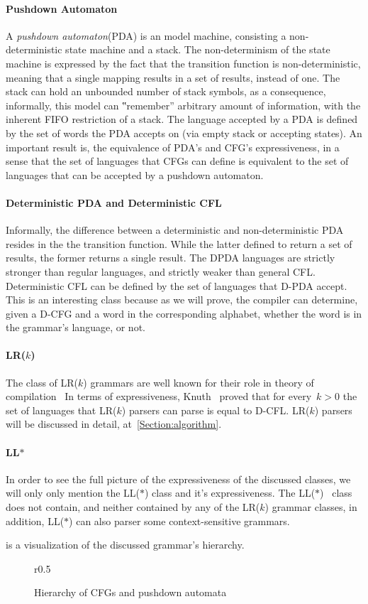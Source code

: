 \paragraph{Pushdown Automaton}
A \emph{pushdown automaton}(PDA) is an model machine, consisting a non-deterministic state machine
  and a stack.
The non-determinism of the state machine is expressed by the fact that the transition function
  is non-deterministic, meaning that a single mapping results in a set of results, instead of one.
The stack can hold an unbounded number of stack symbols, as a consequence, informally,
  this model can ‟remember” arbitrary amount of information, with the inherent FIFO restriction
  of a stack.
The language accepted by a PDA is defined by the set of words the PDA accepts on
  (via empty stack or accepting states).
An important result is, the equivalence of PDA's and CFG's expressiveness, in a sense that
  the set of languages that CFGs can define is equivalent to the set of languages that can be
  accepted by a pushdown automaton.
\paragraph{Deterministic PDA and Deterministic CFL}
Informally, the difference between a deterministic and non-deterministic PDA resides in the
  the transition function.
While the latter defined to return a set of results, the former returns a single result.
The DPDA languages are strictly stronger than regular languages, and strictly weaker than
  general CFL.
Deterministic CFL can be defined by the set of languages that D-PDA accept.
This is an interesting class because as we will prove, the \Java compiler can determine,
  given a D-CFG and a word in the corresponding alphabet, whether the word is in the
  grammar's language, or not.
\paragraph{LR($k$)}
The class of LR($k$) grammars are well known for their role in theory of compilation~\cite{Aho:86}
In terms of expressiveness, Knuth~\cite{Knuth:65} proved that for every~$k>0$ the set of languages
  that LR($k$) parsers can parse is equal to D-CFL.
LR($k$) parsers will be discussed in detail, at~\cref{Section:algorithm}.
\paragraph{LL{$*$}}
In order to see the full picture of the expressiveness of the discussed classes, we will only
  only mention the LL($*$) class and it's expressiveness. The LL($*$)~\cite{Parr:2011} class does not contain,
  and neither contained by any of the LR($k$) grammar classes, in addition, LL($*$) can also
  parser some context-sensitive grammars.

 is a visualization of the discussed grammar's hierarchy.

\begin{wrapfigure}r{0.5\linewidth}
  \caption{ \label{Figure:expressiveness}
  Hierarchy of CFGs and pushdown automata}
  
\end{wrapfigure}
